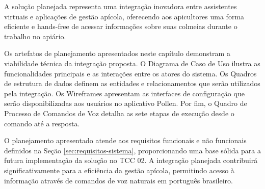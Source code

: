 
A solução planejada representa uma integração inovadora entre assistentes virtuais e aplicações de gestão apícola, oferecendo aos apicultores uma forma eficiente e hands-free de acessar informações sobre suas colmeias durante o trabalho no apiário.

Os artefatos de planejamento apresentados neste capítulo demonstram a viabilidade técnica da integração proposta. O Diagrama de Caso de Uso ilustra as funcionalidades principais e as interações entre os atores do sistema. Os Quadros de estrutura de dados definem as entidades e relacionamentos que serão utilizados pela integração. Os Wireframes apresentam as interfaces de configuração que serão disponibilizadas aos usuários no aplicativo Pollen. Por fim, o Quadro de Processo de Comandos de Voz detalha as sete etapas de execução desde o comando até a resposta.

O planejamento apresentado atende aos requisitos funcionais e não funcionais definidos na Seção \ref{sec:requisitos-sistema}, proporcionando uma base sólida para a futura implementação da solução no TCC 02. A integração planejada contribuirá significativamente para a eficiência da gestão apícola, permitindo acesso à informação através de comandos de voz naturais em português brasileiro.